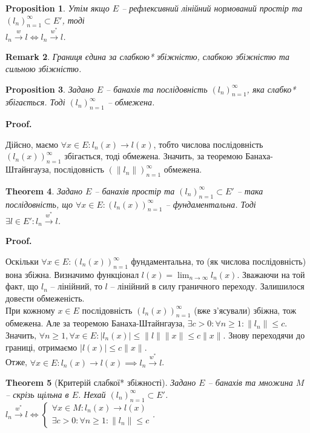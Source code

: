 \documentclass[a4paper, 10pt]{article}
\makeatletter
\theoremstyle{theoremdd}
\newtheorem{theorem}{Theorem}[subsection]
\theoremstyle{theoremdd}
\theoremstyle{theoremdd}
\theoremstyle{theoremdd}
\theoremstyle{theoremdd}
\newtheorem{proposition}[theorem]{Proposition}
\theoremstyle{theoremdd}
\newtheorem{remark}[theorem]{Remark}
\theoremstyle{theoremdd}
\theoremstyle{theoremdd}
\newcommand{\toweak}{\overset{w}{\to}}
\newcommand{\toweakstar}{\overset{w^*}{\to}}
\renewenvironment{proof}[1][Proof.\\]{\par
\pushQED{\hfill \qed}%
\normalfont \topsep6\p@\@plus6\p@\relax
\trivlist
\item\relax
{\bfseries
#1\@addpunct{.}}\hspace\labelsep\ignorespaces
}{%
\popQED\endtrivlist\@endpefalse
}
\makeatother
\begin{document}
\begin{proposition}
Утім якщо $E$ -- рефлексивний лінійний нормований простір та $(l_n)_{n=1}^\infty \subset E'$, тоді\\
$l_n \toweak l \iff l_n \toweakstar l$.
\end{proposition}

\begin{remark}
Границя єдина за слабкою* збіжністю, слабкою збіжністю та сильною збіжністю.
\end{remark}

\begin{proposition}
Задано $E$ -- банахів та послідовність $(l_n)_{n=1}^\infty$, яка слабко* збігається. Тоді $(l_n)_{n=1}^\infty$ -- обмежена.
\end{proposition}

\begin{proof}
Дійсно, маємо $\forall x \in E: l_n(x) \to l(x)$, тобто числова послідовність $(l_n(x))_{n=1}^\infty$ збігається, тоді обмежена. Значить, за теоремою Банаха-Штайнгауза, послідовність $(\|l_n\|)_{n=1}^\infty$ обмежена.
\end{proof}


\begin{theorem}
Задано $E$ -- банахів простір та $(l_n)_{n=1}^\infty \subset E'$ -- така послідовність, що $\forall x \in E: (l_n(x))_{n=1}^\infty$ -- фундаментальна. Тоді $\exists l \in E': l_n \toweakstar l$.
\end{theorem}

\begin{proof}
Оскільки $\forall x \in E: (l_n(x))_{n=1}^\infty$ фундаментальна, то (як числова послідовність) вона збіжна. Визначимо функціонал $l(x) = \displaystyle\lim_{n \to \infty} l_n(x)$. Зважаючи на той факт, що $l_n$ -- лінійний, то $l$ -- лінійний в силу граничного переходу. Залишилося довести обмеженість.\\
При кожному $x \in E$ послідовність $(l_n(x))_{n=1}^\infty$ (вже з'ясували) збіжна, тож обмежена. Але за теоремою Банаха-Штайнгауза, $\exists c > 0: \forall n \geq 1: \|l_n\| \leq c$. Значить, $\forall n \geq 1, \forall x \in E: |l_n(x)| \leq \|l\| \|x\| \leq c \|x\|$. Знову переходячи до границі, отримаємо $|l(x)| \leq c \|x\|$.\\
Отже, $\forall x \in E: l_n(x) \to l(x) \implies l_n \toweakstar l$. 
\end{proof}

\begin{theorem}[Критерій слабкої* збіжності]
Задано $E$ -- банахів та множина $M$ -- скрізь щільна в $E$. Нехай $(l_n)_{n=1}^\infty \subset E'$.\\
$l_n \toweakstar l \iff \begin{cases} \forall x \in M: l_n(x) \to l(x) \\ \exists c > 0: \forall n \geq 1: \|l_n\| \leq c \end{cases}$.
\end{theorem}
\end{document}
